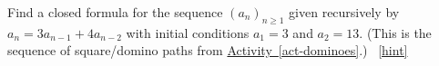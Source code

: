 \documentclass{book}
\begin{document}
\setcounter{project}{149}
\addtocounter{project}{-1}
\begin{activity}[]\label{activity-142}
\hypertarget{p-1006}{}%
Find a closed formula for the sequence \((a_n)_{n \ge 1}\) given recursively by \(a_n = 3a_{n-1} + 4a_{n-2}\) with initial conditions \(a_1 = 3\) and \(a_2 = 13\).  (This is the sequence of square/domino paths from \hyperref[act-dominoes]{Activity~\ref{act-dominoes}}.)%
~\hfill{\tiny\hyperlink{a-149}{[hint]}\hypertarget{q-149}{}}\end{activity}
\end{document}
